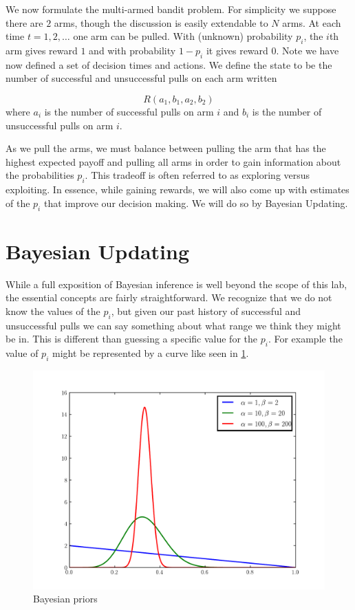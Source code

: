 We now formulate the multi-armed bandit problem.  For simplicity we suppose there are $2$ arms, though the discussion is easily extendable to $N$ arms.  At each time $t= 1,2,\ldots$ one arm can be pulled.  With (unknown) probability $p_i$, the $i$th arm gives reward $1$ and with probability $1-p_i$ it gives reward $0$.  Note we have now defined a set of decision times and actions.  We define the state to be the number of successful and unsuccessful pulls on each arm written

\begin{equation}\label{state}
R(a_1,b_1,a_2,b_2)
\end{equation}
\noindent
where $a_i$ is the number of successful pulls on arm $i$ and $b_i$ is the number of unsuccessful pulls on arm $i$.

As we pull the arms, we must balance between pulling the arm that has the highest expected payoff and pulling all arms in order to gain information about the probabilities $p_i$.  This tradeoff is often referred to as exploring versus exploiting.  In essence, while gaining rewards, we will also come up with estimates of the $p_i$ that improve our decision making.  We will do so by Bayesian Updating.

\section*{Bayesian Updating}
While a full exposition of Bayesian inference is well beyond the scope of this lab, the essential concepts are fairly straightforward.  We recognize that we do not know the values of the $p_i$, but given our past history of successful and unsuccessful pulls we can say something about what range we think they might be in. This is different than guessing a specific value for the $p_i$.  For example the value of $p_i$ might be represented by a curve like seen in \ref{fig:priors}.

\begin{figure}
\begin{center}
        \includegraphics[scale=0.4]{./Algorithms/MarkDecProc/priors.pdf}
        \caption{Bayesian priors}
\end{center}
\label{fig:priors}
\end{figure}

